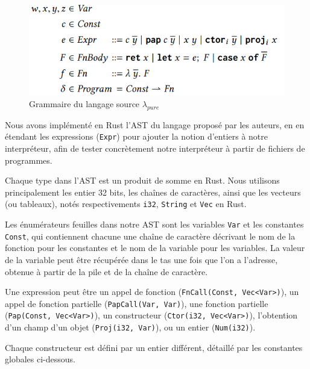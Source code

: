 \documentclass{rapportECL}
\begin{document}
\begin{figure}[hbt!]
	\centering
	\includegraphics[scale=0.70]{logos/grammaire.png}
	\caption{Grammaire du langage source $\lambda_{pure}$}
	\label{fig:grammaire pure}
\end{figure}
\FloatBarrier

Nous avons implémenté en Rust l'AST du langage proposé par les auteurs, en en étendant les 
expressions (\verb|Expr|) pour ajouter la notion d'entiers à notre interpréteur,
afin de tester concrètement notre interpréteur à partir de fichiers de programmes.

Chaque type dans l'AST est un produit de somme en Rust. Nous utilisons principalement les entier 32 bits, les chaînes de caractères,
ainsi que les vecteurs (ou tableaux), notés respectivements \verb|i32|, \verb|String| et \verb|Vec| en Rust.

\bigskip

Les énumérateurs feuilles dans notre AST sont les variables \verb|Var| et les constantes \verb|Const|,
qui contiennent chacune une chaîne de caractère décrivant le nom de la fonction pour les constantes et 
le nom de la variable pour les variables. La valeur de la variable peut être récupérée dans le tas
une fois que l'on a l'adresse, obtenue à partir de la pile et de la chaîne de caractère.

\medskip

Une expression peut être un appel de fonction (\verb|FnCall(Const, Vec<Var>)|), un appel de fonction partielle (\verb|PapCall(Var, Var)|),
une fonction partielle (\verb|Pap(Const, Vec<Var>)|), un constructeur (\verb|Ctor(i32, Vec<Var>)|), 
l'obtention d'un champ d'un objet (\verb|Proj(i32, Var)|), ou un entier (\verb|Num(i32)|).

\medskip

Chaque constructeur est défini par un entier différent, détaillé par les constantes globales ci-dessous.
\end{document}
